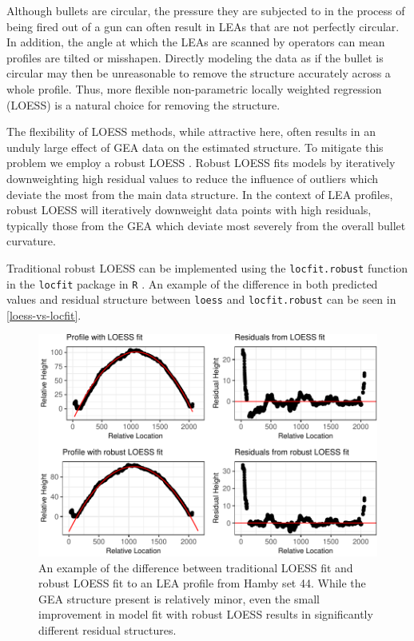 \documentclass[12pt]{article}
\begin{document}
Although bullets are circular, the pressure they are subjected to in the
process of being fired out of a gun can often result in LEAs that are
not perfectly circular. In addition, the angle at which the LEAs are
scanned by operators can mean profiles are tilted or misshapen. Directly
modeling the data as if the bullet is circular may then be unreasonable
to remove the structure accurately across a whole profile. Thus, more
flexible non-parametric locally weighted regression (LOESS) is a natural
choice for removing the structure.

The flexibility of LOESS methods, while attractive here, often results
in an unduly large effect of GEA data on the estimated structure. To
mitigate this problem we employ a robust LOESS \citep{Cleveland1}.
Robust LOESS fits models by iteratively downweighting high residual
values to reduce the influence of outliers which deviate the most from
the main data structure. In the context of LEA profiles, robust LOESS
will iteratively downweight data points with high residuals, typically
those from the GEA which deviate most severely from the overall bullet
curvature.

Traditional robust LOESS can be implemented using the
\texttt{locfit.robust} function in the \texttt{locfit} package in
\texttt{R} \cite{locfit}. An example of the difference in both predicted
values and residual structure between \texttt{loess} and
\texttt{locfit.robust} can be seen in \autoref{loess-vs-locfit}.

\begin{figure}
\centering
\includegraphics{writeup_files/figure-latex/loess-vs-locfit-1.pdf}
\caption{\label{loess-vs-locfit}An example of the difference between
traditional LOESS fit and robust LOESS fit to an LEA profile from Hamby
set 44. While the GEA structure present is relatively minor, even the
small improvement in model fit with robust LOESS results in
significantly different residual structures.}
\end{figure}
\end{document}
